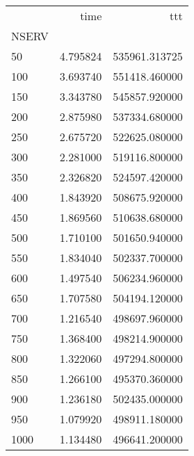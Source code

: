 \begin{tabular}{lrr}
\toprule
{} &      time &            ttt \\
NSERV &           &                \\
\midrule
50    &  4.795824 &  535961.313725 \\
100   &  3.693740 &  551418.460000 \\
150   &  3.343780 &  545857.920000 \\
200   &  2.875980 &  537334.680000 \\
250   &  2.675720 &  522625.080000 \\
300   &  2.281000 &  519116.800000 \\
350   &  2.326820 &  524597.420000 \\
400   &  1.843920 &  508675.920000 \\
450   &  1.869560 &  510638.680000 \\
500   &  1.710100 &  501650.940000 \\
550   &  1.834040 &  502337.700000 \\
600   &  1.497540 &  506234.960000 \\
650   &  1.707580 &  504194.120000 \\
700   &  1.216540 &  498697.960000 \\
750   &  1.368400 &  498214.900000 \\
800   &  1.322060 &  497294.800000 \\
850   &  1.266100 &  495370.360000 \\
900   &  1.236180 &  502435.000000 \\
950   &  1.079920 &  498911.180000 \\
1000  &  1.134480 &  496641.200000 \\
\bottomrule
\end{tabular}
